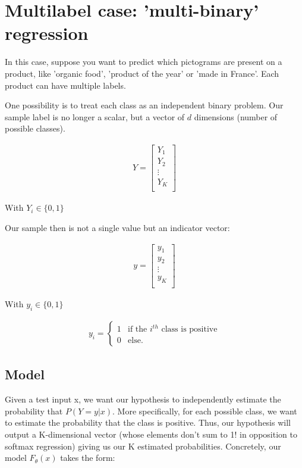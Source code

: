 \section{Multilabel case: 'multi-binary' regression}

In this case, suppose you want to predict which pictograms are present on a product, like 'organic food', 'product of the year' or 'made in France'. Each product can have multiple labels.

One possibility is to treat each class as an independent binary problem. Our sample label is no longer a scalar, but a vector of $d$ dimensions (number of possible classes).

\begin{align}
	Y = \left[
	\begin{array}{cccc}
		Y_{1} \\
		Y_{2} \\
		\vdots\\
		Y_{K} \\
	\end{array}\right]
\end{align}

With $Y_{i} \in \{0, 1\}$

Our sample then is not a single value but an indicator vector:

\begin{align}
	y = \left[
	\begin{array}{cccc}
		y_{1} \\
		y_{2} \\
		\vdots\\
		y_{K} \\
	\end{array}\right]
\end{align}

With $y_{i} \in \{0, 1\}$

\begin{align}
y_{i} = \left\{
    \begin{array}{ll}
        1 & \mbox{if the } i^{th} \mbox{ class is positive} \\
        0 & \mbox{else.}
    \end{array}
\right.
\end{align}

\subsection{Model}

Given a test input x, we want our hypothesis to independently estimate the probability that $P(Y=y | x)$. More specifically, for each possible class, we want to estimate the probability that the class is positive. Thus, our hypothesis will output a K-dimensional vector (whose elements don't sum to 1! in opposition to softmax regression) giving us our K estimated probabilities. Concretely, our model $F_{\theta}(x)$ takes the form:

